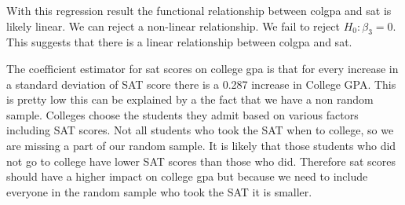 \documentclass[
  12pt,
  landscape]{article}
\begin{document}
With this regression result the functional relationship between colgpa
and sat is likely linear. We can reject a non-linear relationship. We
fail to reject \({H_0: \beta_3 = 0}\). This suggests that there is a
linear relationship between colgpa and sat.

The coefficient estimator for sat scores on college gpa is that for
every increase in a standard deviation of SAT score there is a 0.287
increase in College GPA. This is pretty low this can be explained by a
the fact that we have a non random sample. Colleges choose the students
they admit based on various factors including SAT scores. Not all
students who took the SAT when to college, so we are missing a part of
our random sample. It is likely that those students who did not go to
college have lower SAT scores than those who did. Therefore sat scores
should have a higher impact on college gpa but because we need to
include everyone in the random sample who took the SAT it is smaller.
\end{document}
